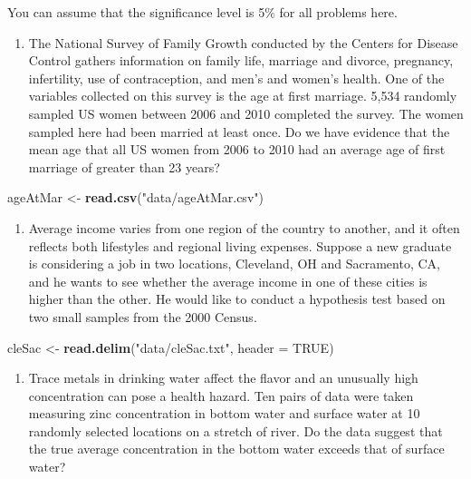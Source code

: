 \documentclass[]{article}
\newenvironment{Shaded}{\begin{snugshade}}{\end{snugshade}}
\newcommand{\KeywordTok}[1]{\textcolor[rgb]{0.13,0.29,0.53}{\textbf{{#1}}}}
\newcommand{\DataTypeTok}[1]{\textcolor[rgb]{0.13,0.29,0.53}{{#1}}}
\newcommand{\StringTok}[1]{\textcolor[rgb]{0.31,0.60,0.02}{{#1}}}
\newcommand{\OtherTok}[1]{\textcolor[rgb]{0.56,0.35,0.01}{{#1}}}
\newcommand{\NormalTok}[1]{{#1}}
\providecommand{\tightlist}{%
  \setlength{\itemsep}{0pt}\setlength{\parskip}{0pt}}
\begin{document}
You can assume that the significance level is 5\% for all problems here.

\begin{enumerate}
\def\labelenumi{\arabic{enumi}.}
\tightlist
\item
  The National Survey of Family Growth conducted by the Centers for
  Disease Control gathers information on family life, marriage and
  divorce, pregnancy, infertility, use of contraception, and men's and
  women's health. One of the variables collected on this survey is the
  age at first marriage. 5,534 randomly sampled US women between 2006
  and 2010 completed the survey. The women sampled here had been married
  at least once. Do we have evidence that the mean age that all US women
  from 2006 to 2010 had an average age of first marriage of greater than
  23 years?
\end{enumerate}

\begin{Shaded}
\begin{Highlighting}[]
\NormalTok{ageAtMar <-}\StringTok{ }\KeywordTok{read.csv}\NormalTok{(}\StringTok{"data/ageAtMar.csv"}\NormalTok{)}
\end{Highlighting}
\end{Shaded}

\begin{enumerate}
\def\labelenumi{\arabic{enumi}.}
\setcounter{enumi}{1}
\tightlist
\item
  Average income varies from one region of the country to another, and
  it often reflects both lifestyles and regional living expenses.
  Suppose a new graduate is considering a job in two locations,
  Cleveland, OH and Sacramento, CA, and he wants to see whether the
  average income in one of these cities is higher than the other. He
  would like to conduct a hypothesis test based on two small samples
  from the 2000 Census.
\end{enumerate}

\begin{Shaded}
\begin{Highlighting}[]
\NormalTok{cleSac <-}\StringTok{ }\KeywordTok{read.delim}\NormalTok{(}\StringTok{"data/cleSac.txt"}\NormalTok{, }\DataTypeTok{header =} \OtherTok{TRUE}\NormalTok{)}
\end{Highlighting}
\end{Shaded}

\begin{enumerate}
\def\labelenumi{\arabic{enumi}.}
\setcounter{enumi}{2}
\tightlist
\item
  Trace metals in drinking water affect the flavor and an unusually high
  concentration can pose a health hazard. Ten pairs of data were taken
  measuring zinc concentration in bottom water and surface water at 10
  randomly selected locations on a stretch of river. Do the data suggest
  that the true average concentration in the bottom water exceeds that
  of surface water?
\end{enumerate}
\end{document}
